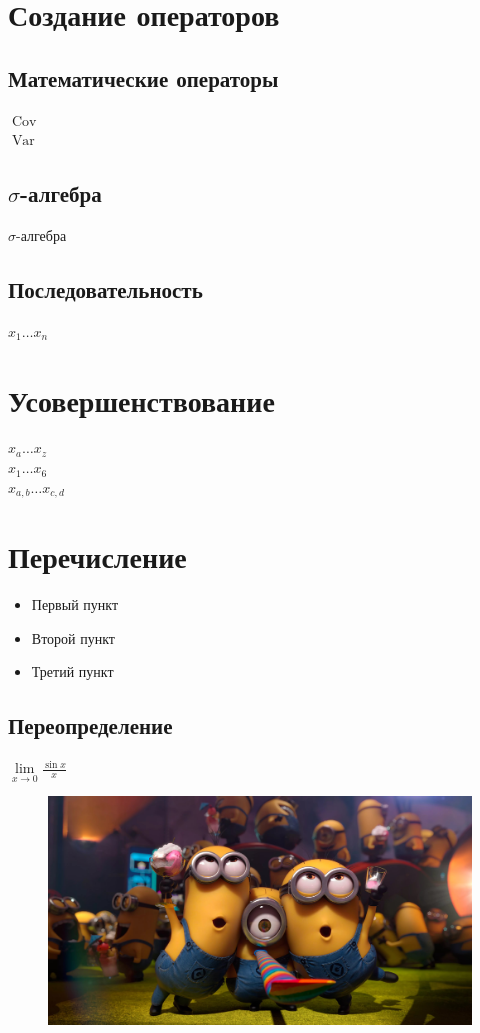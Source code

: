 \documentclass[12pt, a4paper]{article}
\DeclareMathOperator{\Var}{Var}
\DeclareMathOperator{\Cov}{Cov}
\begin{document}
\section{Создание операторов}
\subsection{Математические операторы}
$\Cov$ \\

$\Var$
\subsection{$\sigma$-алгебра}
\def \s {\ensuremath{\sigma}}
\s-алгебра
\subsection{Последовательность}

\def \p {\ensuremath{x_1 \ldots x_n}}
\p

\section{Усовершенствование}
\newcommand{\com}[2]{\ensuremath{x_#1 \ldots x_#2}}
\com{a}{z} \\

\com{1}{6} \\

\com{{a,b}}{{c,d}}
\renewcommand{\labelitemi}{\LARGE{\textcolor{blue}{\textbullet}}}
\section{Перечисление}
\begin{itemize}
\item Первый пункт
\item Второй пункт
\item Третий пункт
\end{itemize}
\subsection{Переопределение}
\newcommand{\llim}{\lim\limits}
$\llim_{x \to 0} \frac{\sin{x}}{x}$

\renewcommand{\thefigure}{\thesection:\arabic{figure}}
\captiondelim{ } 
\begin{figure}[H]
\begin{center}
\includegraphics[width=0.3\textheight]{i.jpg}
\end{center}
\caption{}
\end{figure}
\end{document}
